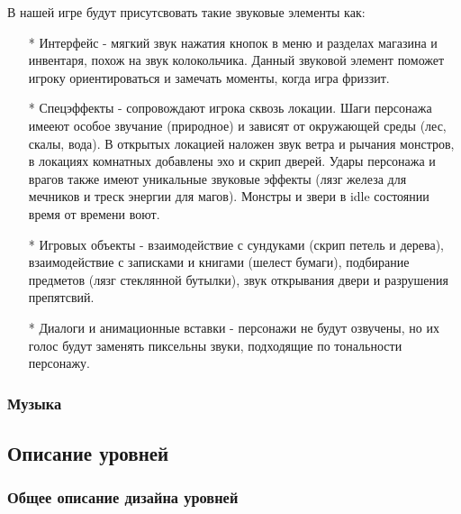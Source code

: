 \documentclass{article}
\begin{document}
В нашей игре будут присутсвовать такие звуковые элементы как:
\begin{itemize}
\item[*] Интерфейс - мягкий звук нажатия кнопок в меню и разделах магазина и инвентаря, похож на звук колокольчика. Данный звуковой элемент поможет игроку ориентироваться и замечать моменты, когда игра фриззит.
\item[*]  Спецэффекты - сопровождают игрока сквозь локации. Шаги персонажа имееют особое звучание (природное) и зависят от окружающей среды (лес, скалы, вода). В открытых локацией наложен звук ветра и рычания монстров, в локациях комнатных добавлены эхо и скрип дверей. Удары персонажа и врагов также имеют уникальные звуковые эффекты (лязг железа для мечников и треск энергии для магов). Монстры и звери в idle состоянии время от времени воют.
\item[*] Игровых объекты - взаимодействие с сундуками (скрип петель и дерева), взаимодействие с записками и книгами (шелест бумаги), подбирание предметов (лязг стеклянной бутылки), звук открывания двери и разрушения препятсвий.
\item[*] Диалоги и анимационные вставки - персонажи не будут озвучены, но их голос будут заменять пиксельны звуки, подходящие по тональности персонажу.
\end{itemize}

\subsubsection{Музыка}

\subsection{Описание уровней}

\subsubsection{Общее описание дизайна уровней}
\end{document}
